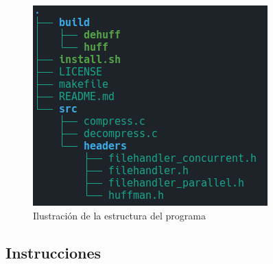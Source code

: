 \documentclass{report}
\begin{document}
\begin{figure}[h]
    \centering
    \includegraphics[width=0.8\linewidth]{figuras/estructura.png}
    \caption{Ilustración de la estructura del programa}
    \label{fig:estructura}
\end{figure}

\subsection{Instrucciones}
\end{document}
